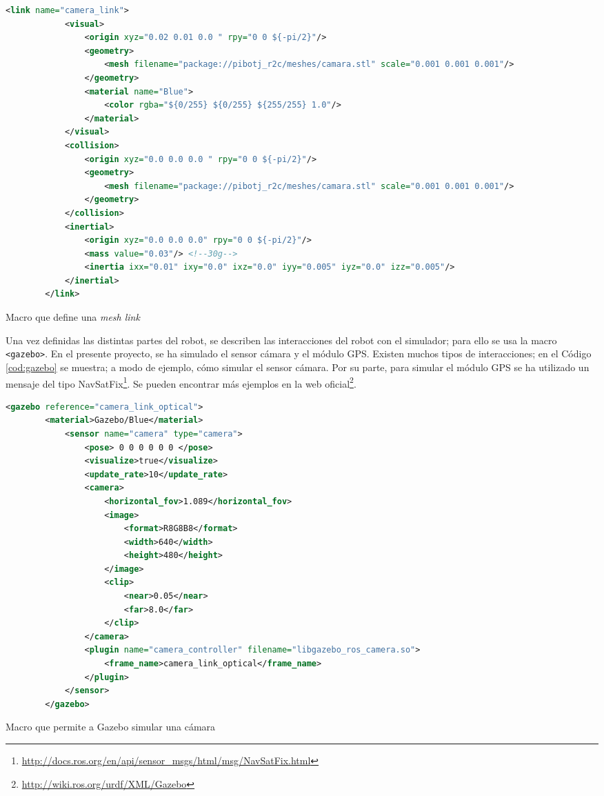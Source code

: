\begin{code}[h]
	\begin{lstlisting}[language=xml]
		<link name="camera_link">
			<visual>
				<origin xyz="0.02 0.01 0.0 " rpy="0 0 ${-pi/2}"/>
				<geometry>
					<mesh filename="package://pibotj_r2c/meshes/camara.stl" scale="0.001 0.001 0.001"/>
				</geometry>
				<material name="Blue">
					<color rgba="${0/255} ${0/255} ${255/255} 1.0"/>
				</material>
			</visual>
			<collision> 
				<origin xyz="0.0 0.0 0.0 " rpy="0 0 ${-pi/2}"/>
				<geometry>
					<mesh filename="package://pibotj_r2c/meshes/camara.stl" scale="0.001 0.001 0.001"/>
				</geometry>
			</collision>
			<inertial>
				<origin xyz="0.0 0.0 0.0" rpy="0 0 ${-pi/2}"/>
				<mass value="0.03"/> <!--30g-->
				<inertia ixx="0.01" ixy="0.0" ixz="0.0" iyy="0.005" iyz="0.0" izz="0.005"/>
			</inertial>
		</link>
	\end{lstlisting}
	\caption[Macro que define una \textit{mesh link}]{Macro que define una \textit{mesh link}}
	\label{cod:ml}
\end{code}


Una vez definidas las distintas partes del robot, se describen las interacciones del robot con el simulador; para ello se usa la macro \verb|<gazebo>|. En el presente proyecto, se ha simulado el sensor cámara y el módulo \acs{GPS}. Existen muchos tipos de interacciones; en el Código \ref{cod:gazebo} se muestra; a modo de ejemplo, cómo simular el sensor cámara. Por su parte, para simular el módulo GPS se ha utilizado un mensaje del tipo NavSatFix\footnote{\url{http://docs.ros.org/en/api/sensor_msgs/html/msg/NavSatFix.html}}. Se pueden encontrar más ejemplos en la web oficial\footnote{\url{http://wiki.ros.org/urdf/XML/Gazebo}}.

\begin{code}[h]
	\begin{lstlisting}[language=xml]
		<gazebo reference="camera_link_optical">
		<material>Gazebo/Blue</material>
			<sensor name="camera" type="camera">
				<pose> 0 0 0 0 0 0 </pose>
				<visualize>true</visualize>
				<update_rate>10</update_rate>
				<camera>
					<horizontal_fov>1.089</horizontal_fov>
					<image>
						<format>R8G8B8</format>
						<width>640</width>
						<height>480</height>
					</image>
					<clip>
						<near>0.05</near>
						<far>8.0</far>
					</clip>
				</camera>
				<plugin name="camera_controller" filename="libgazebo_ros_camera.so">
					<frame_name>camera_link_optical</frame_name>
				</plugin>
			</sensor>
		</gazebo>
	\end{lstlisting}
	\caption[Macro que permite a Gazebo simular una cámara]{Macro que permite a Gazebo simular una cámara}
	\label{cod:gazebo}
\end{code}

